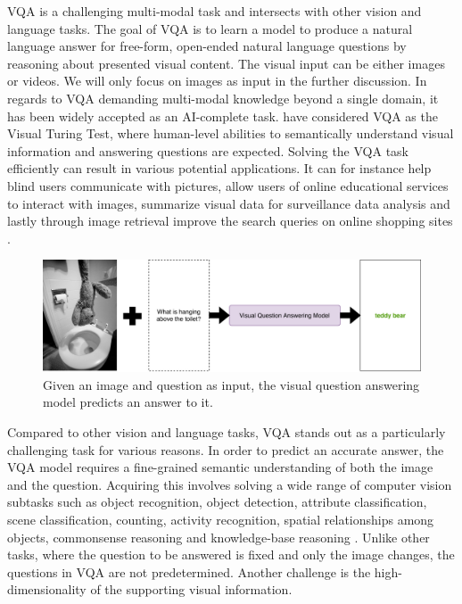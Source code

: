 \documentclass{article}
\begin{document}
VQA is a challenging multi-modal task and intersects with other vision and language tasks. The goal of VQA is to learn a model to produce a natural language answer for free-form, open-ended natural language questions by reasoning about presented visual content. The visual input can be either images or videos. We will only focus on images as input in the further discussion. In regards to VQA demanding multi-modal knowledge beyond a single domain, it has been widely accepted as an AI-complete task. \citet{geman2015visual} have considered VQA as the Visual Turing Test, where human-level abilities to semantically understand visual information and answering questions are expected. Solving the VQA task efficiently can result in various potential applications. It can for instance help blind users communicate with pictures, allow users of online educational services to interact with images, summarize visual data for surveillance data analysis and lastly through image retrieval improve the search queries on online shopping sites \citep{manmadhan2020vqa}.

\begin{figure}[H]
	\centering
	\includegraphics[width=\linewidth]{vqa_graph.pdf}
	\caption{Given an image and question as input, the visual question answering model predicts an answer to it.}
	\label{fig:vqa-graph}
\end{figure}

Compared to other vision and language tasks, VQA stands out as a particularly challenging task for various reasons. In order to predict an accurate answer, the VQA model requires a fine-grained semantic understanding of both the image and the question. Acquiring this involves solving a wide range of computer vision subtasks such as object recognition, object detection, attribute classification, scene classification, counting, activity recognition, spatial relationships among objects, commonsense reasoning and knowledge-base reasoning \citep{manmadhan2020vqa}. Unlike other tasks, where the question to be answered is fixed and only the image changes, the questions in VQA are not predetermined. Another challenge is the high-dimensionality of the supporting visual information.
\end{document}
